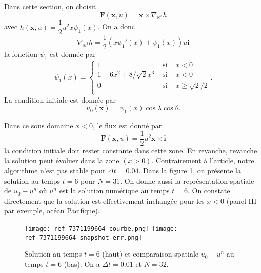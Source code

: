 \documentclass[10pt,a4paper]{article}
\begin{document}
Dans cette section, on choisit 
\begin{equation}
\mathbf{F}(\mathbf{x},u) = \mathbf{x} \times \nabla_{\mathbb{R}^3} h
\end{equation}
avec $h(\mathbf{x},u) = \dfrac{1}{2} u^2 x \psi_1(x)$. On a donc
\begin{equation}
\nabla_{\mathbb{R}^3} h = \dfrac{1}{2}(x \psi_1'(x) + \psi_1(x)) u  \mathbf{i}
\end{equation}
la fonction $\psi_1$ est donnée par
\begin{equation}
\psi_1(x) = \left\lbrace
\begin{array}{ccl}
1 & \text{ si } & x<0 \\
1 - 6 x^2 + 8/\sqrt{2} x^3 & \text{ si } & x<0 \\
0 & \text{ si } & x \geq \sqrt{2}/2 \\
\end{array}
\right. .
\end{equation}
La condition initiale est donnée par 
\begin{equation}
u_0(\mathbf{x}) = \psi_1(x) \cos \lambda \cos \theta.
\end{equation}


Dans ce sous domaine $x<0$, le flux est donné par
\begin{equation}
\mathbf{F}(\mathbf{x},u) = \dfrac{1}{2} u^2 \mathbf{x} \times \mathbf{i} 
\end{equation}
la condition initiale doit rester constante dans cette zone. En revanche, revanche la solution peut évoluer dans la zone $(x>0)$. Contrairement à l'article, notre algorithme n'est pas stable pour $\Delta t = 0.04$. Dans la figure \ref{fig:test4}, on présente la solution au temps $t=6$ pour $N=31$. On donne aussi la représentation spatiale de $u_0 - u^n$ où $u^n$ est la solution numérique au temps $t=6$. On constate directement que la solution est effectivement inchangée pour les $x<0$ (panel III par exemple, océan Pacifique). 

\begin{figure}
\begin{center}
\texttt{[image: ref\_7371199664\_courbe.png]}
\texttt{[image: ref\_7371199664\_snapshot\_err.png]}
\caption{Solution au temps $t=6$ (haut) et comparaison spatiale $u_0-u^n$ au temps $t=6$ (bas). On a $\Delta t = 0.01$ et $N=32$.}
\end{center}
\label{fig:test4}
\end{figure}
\end{document}
